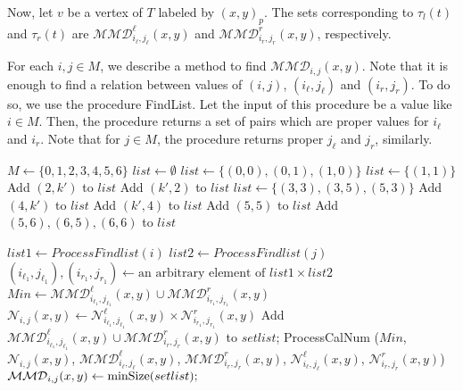\documentclass[12pt]{article}
\theoremstyle{definition}
\theoremstyle{remark}
\begin{document}
Now, let $v$ be a vertex of $T$ labeled by $(x,y)_p$.  The sets corresponding to  $\tau_l(t)$ and $\tau_r(t)$ are $\mathcal{MMD}_{i_\ell,j_\ell}^\ell(x,y)$ and $\mathcal{MMD}_{i_r,j_r}^r(x,y)$, respectively.

For each $i,j \in M$, we describe a method to find $\mathcal{MMD}_{i,j}(x,y)$. Note that it is enough to find a relation between values of $(i,j)$,  $(i_\ell,j_\ell)$ and $(i_r,j_r)$.
To do so, we use the procedure FindList.
  Let the input of this procedure be a value like $i \in M$. Then,  the procedure returns a set of pairs which  are proper values for $i_\ell$ and $i_r$.  Note that for $j \in M$, the procedure returns proper  $j_\ell$ and $j_r$, similarly.

\begin{algorithm}[h!]
	\begin{algorithmic}[1] 
		\State $M \gets \{0,1,2,3,4,5,6\}$
		\State $list\gets \emptyset$
		\EndFor
		\State $list\gets \{(0,0),(0,1),(1,0)\}$
		\EndCase
		\State $list\gets \{(1,1)\}$
		\EndCase
		\State Add $(2,k')$ to $list$
		\State Add $(k',2)$ to $list$
		\EndFor
		\EndCase
		\State $list\gets \{(3,3),(3,5),(5,3)\}$
		\EndCase
		\State Add $(4,k')$ to $list$
		\State Add $(k',4)$ to $list$
		\EndFor
		\EndCase
		\State Add $(5,5)$ to $list$
		\EndCase
		\State Add $(5,6),(6,5),(6,6)$ to $list$
		\EndCase	
		\EndSwitch
		\EndProcedure
	\end{algorithmic}
\end{algorithm}

\begin{algorithm}[h!]
	\begin{algorithmic}[1]
		\State $list1\gets  ProcessFindlist(i)$
		\State $list2 \gets ProcessFindlist(j)$
		\State $(i_{\ell_1},j_{\ell_1}),(i_{r_1},j_{r_1}) \gets \text{an arbitrary element of } list1 \times list2$
		\State $Min \gets \mathcal{MMD}_{i_{\ell_1},j_{\ell_1}}^\ell(x,y)\cup \mathcal{MMD}_{i_{r_1},j_{r_1}}^r(x,y)$
		\State $\mathcal{N}_{i,j}(x,y) \gets \mathcal{N}_{i_{\ell_1},j_{\ell_1}}^\ell(x,y)\times \mathcal{N}_{i_{r_1},j_{r_1}}^r(x,y)$
		\State Add $\mathcal{MMD}_{i_{\ell_1},j_{\ell_1}}^\ell(x,y)\cup \mathcal{MMD}_{i_r,j_r}^r(x,y)$ to $setlist$;
		\State ProcessCalNum ($Min$, $\mathcal{N}_{i,j}(x,y)$, $\mathcal{MMD}_{i_\ell,j_\ell}^\ell(x,y)$, $ \mathcal{MMD}_{i_r,j_r}^r(x,y)$,  $\mathcal{N}_{i_\ell,j_\ell}^\ell(x,y)$, $ \mathcal{N}_{i_r,j_r}^r(x,y)$)
		\EndFor
		\State $\mathcal{MMD}_{i,j}(x,y)\gets \mbox{minSize}(setlist);$
		\EndFor
		\EndProcedure
	\end{algorithmic}
\end{algorithm}
\end{document}
